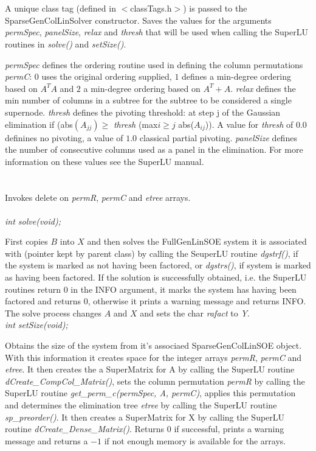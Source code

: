   \\
  \\
A unique class tag (defined in $<$classTags.h$>$) is passed to the
SparseGenColLinSolver constructor. Saves the values for the arguments
{\em permSpec}, {\em panelSize}, {\em relax} and {\em thresh} that
will be used when calling the SuperLU routines in {\em solve()} and
{\em setSize()}.

{\em permSpec} defines the ordering routine used in defining the
column permutations {\em permC}: $0$ uses the original ordering
supplied, $1$ defines a min-degree ordering based on $A^TA$ and $2$ a
min-degree ordering based on $A^T + A$. {\em relax} defines the min
number of columns in a subtree for the subtree to be considered a
single supernode. {\em thresh} defines the pivoting threshold: at
step j of the Gaussian elimination if (abs$(A_{jj}) \ge$ {\em thresh}
(max$ i \ge j$ abs($A_{ij}$)). A value for {\em thresh} of $0.0$
definines no pivoting, a value of $1.0$ classical partial pivoting.
{\em panelSize} defines the number of consecutive columns used as a
panel in the elimination. For more information on these values see the
SuperLU manual. \\


 \\
\\ 
Invokes delete on {\em permR}, {\em permC} and {\em etree} arrays. \\


  \\
{\em int solve(void);} 

First copies $B$ into $X$ and then solves the FullGenLinSOE system 
it is associated with (pointer kept by parent class) by calling the SeuperLU
routine {\em dgstrf()}, if the system is marked as not having been factored,
or {\em dgstrs()}, if system is marked as having been factored. If the
solution is successfully obtained, i.e. the SuperLU routines return $0$
in the INFO argument, it marks the system has having been
factored and returns $0$, otherwise it prints a warning message and
returns INFO. The solve process changes $A$ and $X$ and sets the char
{\em rafact} to {\em Y}. \\   

{\em int setSize(void);} 

Obtains the size of the system from it's associaed SparseGenColLinSOE
object. With this information it creates space for the integer arrays
{\em permR}, {\em permC} and {\em etree}. It then creates the
a SuperMatrix for A by calling the SuperLU routine {\em
dCreate\_CompCol\_Matrix()}, sets the column permutation {\em permR}
by calling the SuperLU routine {\em get\_perm\_c(permSpec, A, permC)},
applies this permutation and determines the elimination tree {\em
etree} by calling the SuperLU routine {\em sp\_preorder()}. It then
creates a SuperMatrix for X by calling the SuperLU routine 
{\em dCreate\_Dense\_Matrix()}.
Returns $0$ if successful, prints a warning message and returns
a $-1$ if not enough memory is available for the arrays. \\



